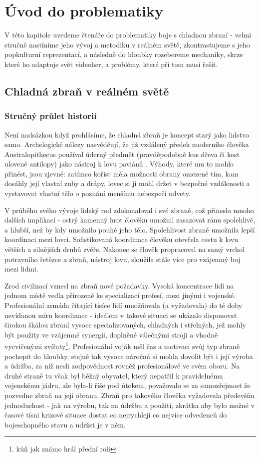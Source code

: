 \chapter{Úvod do problematiky}
V této kapitole uvedeme čtenáře do problematiky boje s chladnou zbraní - velmi stručně nastíníme jeho vývoj a metodiku v reálném světě, zkontrastujeme s jeho popkulturní reprezentací, a následně do hloubky rozebereme mechaniky, skrze které ho adaptuje svět videoher, a problémy, které při tom musí řešit.


\section{Chladná zbraň v reálném světě}
\subsection{Stručný průlet historií}
Není nadsázkou když prohlásíme, že chladná zbraň je koncept starý jako lidstvo samo. Archelogické nálezy nasvědčují, že již vzdálený předek moderního člověka Australopithecus používal úderný předmět (pravděpodobně kus dřeva či kost ulovené antilopy) jako nástroj k lovu paviánů \cite{AustralopithecusWeapon}. Výhody, které mu to mohlo přinést, jsou zjevné: zatímco kořist měla možnosti obrany omezené tím, kam dosáhly její vlastní zuby a drápy, lovec si ji mohl držet v bezpečné vzdálenosti a vystavovat vlastní tělo o poznání menšímu nebezpečí odvety.

V průběhu svého vývoje lidský rod zdokonaloval i své zbraně, což přineslo mnoho dalších implikací - ostrý kamenný hrot člověku umožnil zasazovat ránu spolehlivě, a hlubší, než by kdy umožnilo pouhé jeho tělo. Spolehlivost zbraně umožnila lepší koordinaci mezi lovci. Sofistikovaná koordinace člověku otevřela cestu k lovu větších a silnějších druhů zvěře. Nakonec se člověk propracoval na samý vrchol potravního řetězce a zbraň, nástroj lovu, sloužila stále více pro vzájemný boj mezi lidmi. 

Zrod civilizací vznesl na zbraň nové požadavky. Vysoká koncentrace lidí na jednom místě vedla přirozeně ke specializaci profesí, mezi jinými i vojenské. Profesionální armáda čítající tisíce lidí umožňovala (a vyžadovala) do té doby nevídanou míru koordinace - ideálem v takové situaci se ukázalo disponovat širokou škálou zbraní vysoce specializovaných, chladných i střelných, jež mohly být použity ve vzájemné synergii, doplněné válečnými stroji a vhodně vycvičenými zvířaty\footnote{kůň jak známo hrál přední roli}. Profesionální voják měl čas a motivaci svůj typ zbraně pochopit do hloubky, stejně tak vysoce náročná si mohla dovolit být i její výroba a údržba, za níž nesli zodpovědnost rovněž profesionálové ve svém oboru. 
Na druhé straně tu však byl běžný obyvatel, který nepatřil k pravidelnému vojenskému jádru, ale byla-li říše pod útokem, považovalo se za samozřejmost že pozvedne zbraň na její obranu. Zbraň pro takového člověka vyžadovala především jednoduchost - jak na výrobu, tak na údržbu a použití, zkrátka aby bylo možné v časové tísni krizové situace dostat co nejrychleji co nejvíce odvedenců do bojeschopného stavu a udržet je v něm.

